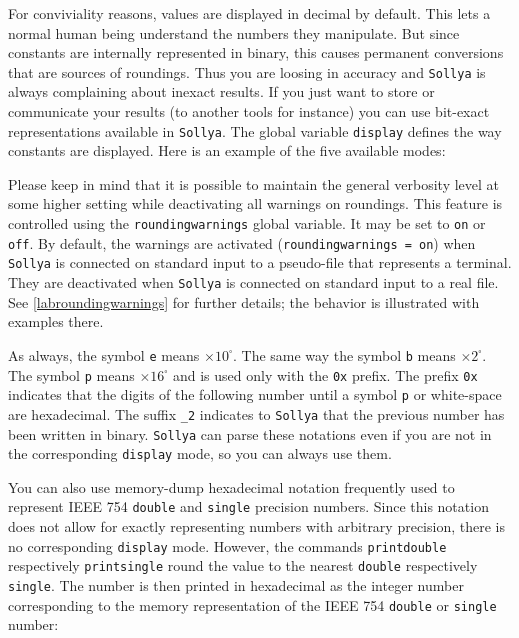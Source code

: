 \documentclass[a4paper]{article}
\newcommand{\com}[1]{\texttt{#1}}
\newcommand{\key}[1]{\texttt{#1}}
\newcommand{\sollya}{\texttt{Sollya}\xspace}
\begin{document}


For conviviality reasons, values are displayed in decimal by default. This lets a normal human being understand the numbers they manipulate. But since constants are internally represented in binary, this causes permanent conversions that are sources of roundings. Thus you are loosing in accuracy and \sollya is always complaining about inexact results. If you just want to store or communicate your results (to another tools for instance) you can use bit-exact representations available in \sollya. The global variable \key{display} defines the way constants are displayed. Here is an example of the five available modes:



Please keep in mind that it is possible to maintain the general verbosity level at
some higher setting while deactivating all warnings on roundings. This
feature is controlled using the \key{roundingwarnings} global
variable. It may be set to \key{on} or \key{off}. By default, the
warnings are activated (\key{roundingwarnings = on}) when \sollya is
connected on standard input to a pseudo-file that represents a
terminal. They are deactivated when \sollya is connected on standard
input to a real file. See \ref{labroundingwarnings} for further details; the behavior is
illustrated with examples there.

As always, the symbol \texttt{e} means $\times 10^\square $. The same way the symbol \texttt{b} means  $\times 2^\square $. The symbol \texttt{p} means $\times 16^\square$ and is used only with the \texttt{0x} prefix. The prefix \texttt{0x} indicates that the digits of the following number until 
a symbol \texttt{p} or white-space are hexadecimal. The suffix \texttt{\_2} indicates to \sollya that the previous number has been written in binary. \sollya can parse these notations even if you are not in the corresponding \key{display} mode, so you can always use them.

You can also use memory-dump hexadecimal notation frequently used to represent IEEE 754 \texttt{double} and \texttt{single} precision numbers. Since this notation does not allow for exactly representing numbers with arbitrary precision, there is no corresponding \key{display} mode. However, the commands \com{printdouble} respectively \com{printsingle} round the value to the nearest \texttt{double} respectively \texttt{single}. The number is then printed in hexadecimal as the integer number corresponding to the memory representation of the IEEE 754 \texttt{double} or \texttt{single} number:
\end{document}
